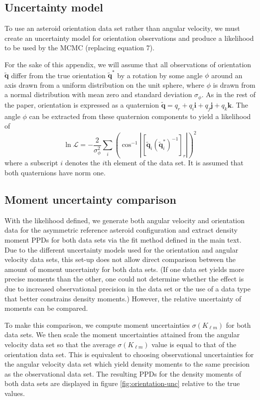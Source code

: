 \documentclass[9pt,twocolumn]{article}
\newcommand{\parens}[1]{\left( #1 \right)}
\newcommand{\brackets}[1]{\left[ #1 \right]}
\newcommand{\quat}[1]{\widetilde{\bm{#1}}}
\numberwithin{equation}{section}
\begin{document}
\subsection{Uncertainty model}
To use an asteroid orientation data set rather than angular velocity, we must create an uncertainty model for orientation observations and produce a likelihood to be used by the MCMC (replacing equation 7).

For the sake of this appendix, we will assume that all observations of orientation $\quat q$ differ from the true orientation $\quat q^*$ by a rotation by some angle $\phi$ around an axis drawn from a uniform distribution on the unit sphere, where $\phi$ is drawn from a normal distribution with mean zero and standard deviation $\sigma_\phi$. As in the rest of the paper, orientation is expressed as a quaternion $\quat q = q_r + q_i \bm i + q_j \bm j + q_k \bm k$. The angle $\phi$ can be extracted from these quaternion components to yield a likelihood of
\begin{equation}
  \ln \mathcal{L} = -\frac{2}{\sigma_\phi^2}\sum_{i}\parens{\cos^{-1}\left|\brackets{\quat q_i (\quat q_i^*)^{-1}}_r\right|}^2
  \label{eqn:orientation-like}
\end{equation}
where a subscript $i$ denotes the $i$th element of the data set. It is assumed that both quaternions have norm one.

\subsection{Moment uncertainty comparison}
With the likelihood defined, we generate both angular velocity and orientation data for the asymmetric reference asteroid configuration and extract density moment PPDs for both data sets via the fit method defined in the main text. Due to the different uncertainty models used for the orientation and angular velocity data sets, this set-up does not allow direct comparison between the amount of moment uncertainty for both data sets. (If one data set yields more precise moments than the other, one could not determine whether the effect is due to increased observational precision in the data set or the use of a data type that better constrains density moments.) However, the relative uncertainty of moments can be compared.

To make this comparison, we compute moment uncertainties $\sigma(K_{\ell m})$ for both data sets. We then scale the moment uncertainties attained from the angular velocity data set so that the average $\sigma(K_{\ell m})$ value is equal to that of the orientation data set. This is equivalent to choosing observational uncertainties for the angular velocity data set which yield density moments to the same precision as the observational data set. The resulting PPDs for the density moments of both data sets are displayed in figure \ref{fig:orientation-unc} relative to the true values.
\end{document}
